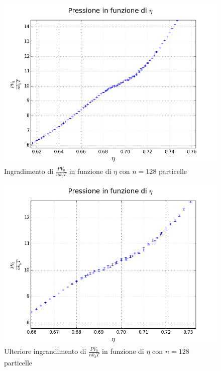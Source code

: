 \begin{figure}[h!]
	\centering
	\includegraphics[scale=0.48]{sfere2D/pressionzoom.png}
	\caption{Ingradimento di $\frac{P V_0}{n k_{b} T}$ in funzione di $\eta$ con $n=128$ particelle}
	\end{figure}

\begin{figure}[h!]
	\centering
	\includegraphics[scale=0.48]{sfere2D/pressionzoomzoom.png}
	\caption{Ulteriore ingrandimento di  $\frac{P V_0}{n k_{b} T}$ in funzione di $\eta$ con $n=128$ particelle}
	\end{figure}





